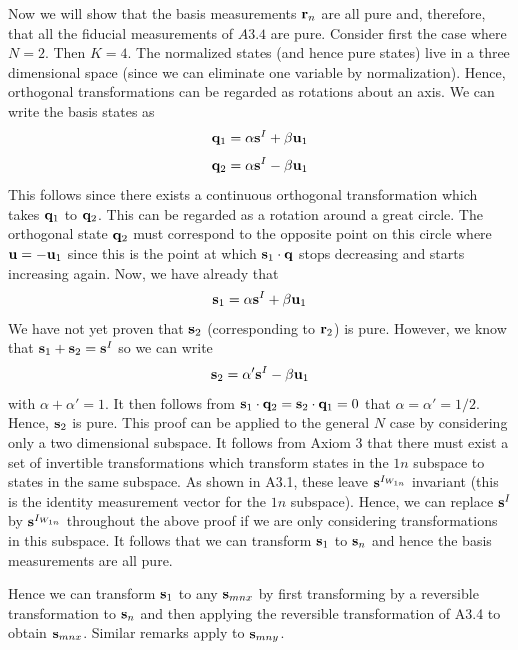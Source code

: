 \documentclass[12pt]{article}
\begin{document}
Now we will show that the basis measurements ${\bf r}_{n}$ are all
pure and, therefore, that all the fiducial measurements of $A3.4$ are
pure.  Consider first the case where $N=2$. Then $K=4$.  The normalized
states (and hence pure states) live in a three dimensional space (since
we can eliminate one variable by normalization).  Hence, orthogonal
transformations can be regarded as rotations about an axis.
We can write the basis
states as
\begin{equation}
{\bf q}_1=\alpha {\bf s}^I + \beta{\bf u}_1
\end{equation}
\begin{equation}
{\bf q}_2=\alpha {\bf s}^I - \beta{\bf u}_1
\end{equation}
This follows since there exists a continuous orthogonal
transformation which takes ${\bf q}_1$ to ${\bf q}_2$.  This can be
regarded as a rotation around a great circle.  The orthogonal state ${\bf
q}_2$ must correspond to the opposite point on this circle where ${\bf
u}=-{\bf u}_1$ since this is the point at which ${\bf s}_1\cdot {\bf q}$
stops decreasing and starts increasing again.
Now, we have already that
\begin{equation}
{\bf s}_1=\alpha {\bf s}^I + \beta{\bf u}_1
\end{equation}
We have not yet proven that ${\bf s}_2$ (corresponding to ${\bf
r}_{2}$) is pure. However, we know that ${\bf s}_1+{\bf s}_2={\bf s}^I$
so we can write
\begin{equation}
{\bf s}_2=\alpha' {\bf s}^I - \beta{\bf u}_1
\end{equation}
with $\alpha+\alpha'=1$.  It then follows from ${\bf s}_1\cdot{\bf q}_2=
{\bf s}_2\cdot{\bf q}_1=0$ that $\alpha=\alpha'=1/2$.  Hence, ${\bf
s}_2$ is pure.   This proof can be applied to the general $N$ case by
considering only a two dimensional subspace.  It follows from Axiom 3
that there must exist a set of invertible transformations which
transform states in the $1n$ subspace to states in the same subspace.
As shown in A3.1, these leave ${\bf s}^{I_{W_{1n}}}$ invariant (this is
the identity
measurement vector for the $1n$ subspace). Hence, we can replace ${\bf
s}^I$ by ${\bf s}^{I_{W_{1n}}}$ throughout the above proof if we are only
considering transformations in this subspace.  It follows that we can
transform ${\bf s}_1$ to ${\bf s}_n$ and hence the basis measurements
are all pure.

Hence we can transform ${\bf s}_1$ to any ${\bf s}_{mnx}$ by first
transforming by a reversible transformation to ${\bf s}_n$ and then
applying the reversible transformation of A3.4 to obtain ${\bf
s}_{mnx}$. Similar remarks apply to ${\bf s}_{mny}$.
\end{document}
